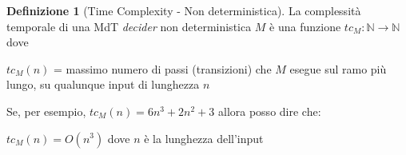 \documentclass{article}  %
\theoremstyle{definition}
\newtheorem{definition}{Definizione}[section]
\begin{document}
\begin{definition}[Time Complexity - Non deterministica]
	La complessità temporale di una MdT \textit{decider} non deterministica $M$ è una funzione $tc_M:\mathbb{N}\rightarrow\mathbb{N}$ dove
	\begin{center}
		\footnotesize
		$tc_M(n)$ = massimo numero di passi (transizioni) che $M$ esegue sul ramo più lungo, su qualunque input di lunghezza $n$
	\end{center}
\end{definition}
\begin{esempio}
	\footnotesize
	Se, per esempio, $tc_M(n)=6n^3+2n^2+3$ allora posso dire che:
	\begin{center}
		$tc_M(n)=O(n^3)$ dove $n$ è la lunghezza dell'input
	\end{center}
\end{esempio}
\end{document}
